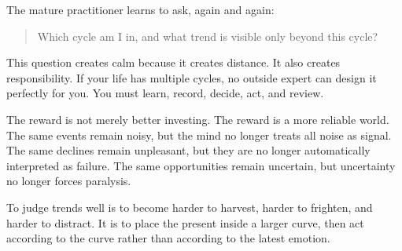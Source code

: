 The mature practitioner learns to ask, again and again:

\begin{quote}
Which cycle am I in, and what trend is visible only beyond this cycle?
\end{quote}

This question creates calm because it creates distance. It also creates responsibility. If your life has multiple cycles, no outside expert can design it perfectly for you. You must learn, record, decide, act, and review.

The reward is not merely better investing. The reward is a more reliable world. The same events remain noisy, but the mind no longer treats all noise as signal. The same declines remain unpleasant, but they are no longer automatically interpreted as failure. The same opportunities remain uncertain, but uncertainty no longer forces paralysis.

To judge trends well is to become harder to harvest, harder to frighten, and harder to distract. It is to place the present inside a larger curve, then act according to the curve rather than according to the latest emotion.

